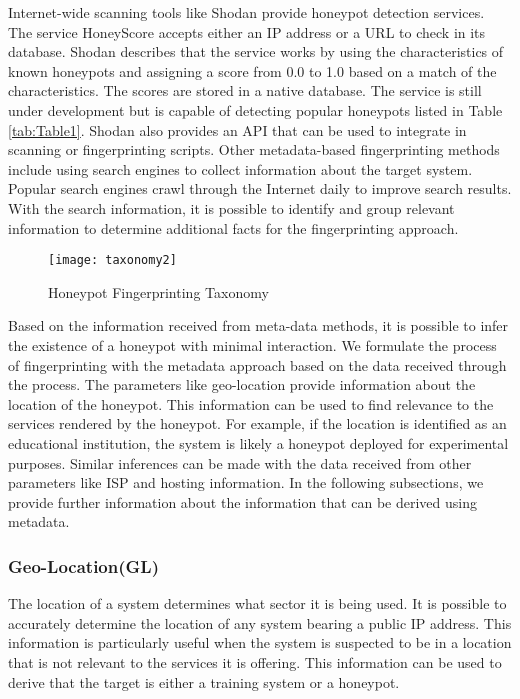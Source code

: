 Internet-wide scanning tools like Shodan provide honeypot detection services. The service HoneyScore accepts either an IP address or a URL to check in its database. Shodan describes that the service works by using the characteristics of known honeypots and assigning a score from 0.0 to 1.0 based on a match of the characteristics. The scores are stored in a native database. The service is still under development but is capable of detecting popular honeypots listed in Table \ref{tab:Table1}. Shodan also provides an API that can be used to integrate in scanning or fingerprinting scripts. Other metadata-based fingerprinting methods include using search engines to collect information about the target system. Popular search engines crawl through the Internet daily to improve search results. With the search information, it is possible to identify and group relevant information to determine additional facts for the fingerprinting approach. 

\begin{figure}
    \centering
    \texttt{[image: taxonomy2]}
    \caption{Honeypot Fingerprinting Taxonomy}
    \label{fig:taxonomy}
\end{figure}



Based on the information received from meta-data methods, it is possible to infer the existence of a honeypot with minimal interaction. We formulate the process of fingerprinting with the metadata approach based on the data received through the process. The parameters like geo-location provide information about the location of the honeypot. This information can be used to find relevance to the services rendered by the honeypot. For example, if the location is identified as an educational institution, the system is likely a honeypot deployed for experimental purposes. Similar inferences can be made with the data received from other parameters like ISP and hosting information. In the following subsections, we provide further information about the information that can be derived using metadata. 

\subsubsection{Geo-Location(GL)}
The location of a system determines what sector it is being used. It is possible to accurately determine the location of any system bearing a public IP address. This information is particularly useful when the system is suspected to be in a location that is not relevant to the services it is offering. This information can be used to derive that the target is either a training system or a honeypot. 

